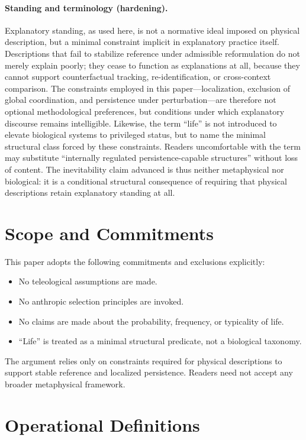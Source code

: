 \documentclass[11pt]{article}
\begin{document}
\paragraph{Standing and terminology (hardening).}
Explanatory standing, as used here, is not a normative ideal imposed on physical description, but a minimal constraint implicit in explanatory practice itself. Descriptions that fail to stabilize reference under admissible reformulation do not merely explain poorly; they cease to function as explanations at all, because they cannot support counterfactual tracking, re-identification, or cross-context comparison. The constraints employed in this paper---localization, exclusion of global coordination, and persistence under perturbation---are therefore not optional methodological preferences, but conditions under which explanatory discourse remains intelligible. Likewise, the term ``life'' is not introduced to elevate biological systems to privileged status, but to name the minimal structural class forced by these constraints. Readers uncomfortable with the term may substitute ``internally regulated persistence-capable structures'' without loss of content. The inevitability claim advanced is thus neither metaphysical nor biological: it is a conditional structural consequence of requiring that physical descriptions retain explanatory standing at all.

\section{Scope and Commitments}

This paper adopts the following commitments and exclusions explicitly:

\begin{itemize}[leftmargin=2em]
\item No teleological assumptions are made.
\item No anthropic selection principles are invoked.
\item No claims are made about the probability, frequency, or typicality of life.
\item ``Life'' is treated as a minimal structural predicate, not a biological taxonomy.
\end{itemize}

The argument relies only on constraints required for physical descriptions to support stable reference and localized persistence. Readers need not accept any broader metaphysical framework.

\section{Operational Definitions}
\end{document}
